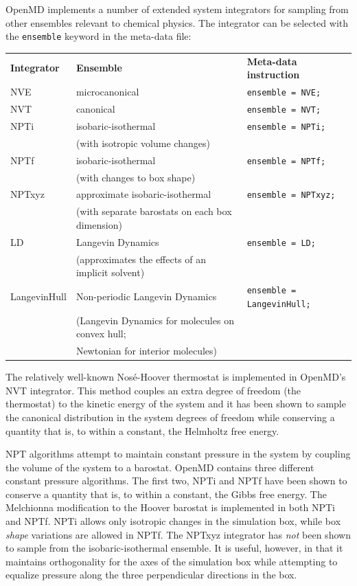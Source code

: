 \documentclass[]{book}
\begin{document}
{\sc OpenMD} implements a number of extended system integrators for
sampling from other ensembles relevant to chemical physics.  The
integrator can be selected with the {\tt ensemble} keyword in the
meta-data file:

\begin{center}
\begin{tabular}{lll}
{\bf Integrator} & {\bf Ensemble} & {\bf Meta-data instruction} \\
NVE & microcanonical & {\tt ensemble = NVE; } \\
NVT & canonical & {\tt ensemble = NVT; } \\
NPTi & isobaric-isothermal & {\tt ensemble = NPTi;} \\
  &  (with isotropic volume changes) & \\
NPTf & isobaric-isothermal & {\tt ensemble = NPTf;} \\
  & (with changes to box shape) & \\
NPTxyz & approximate isobaric-isothermal & {\tt ensemble = NPTxyz;} \\
 &  (with separate barostats on each box dimension) & \\
LD & Langevin Dynamics & {\tt ensemble = LD;} \\
 &  (approximates the effects of an implicit solvent) & \\
 LangevinHull & Non-periodic Langevin Dynamics  & {\tt ensemble = LangevinHull;} \\
 & (Langevin Dynamics for molecules on convex hull;\\
 & Newtonian for interior molecules) & \\
\end{tabular}
\end{center}

The relatively well-known Nos\'e-Hoover thermostat\cite{Hoover85} is
implemented in {\sc OpenMD}'s NVT integrator.  This method couples an
extra degree of freedom (the thermostat) to the kinetic energy of the
system and it has been shown to sample the canonical distribution in
the system degrees of freedom while conserving a quantity that is, to
within a constant, the Helmholtz free energy.\cite{melchionna93}

NPT algorithms attempt to maintain constant pressure in the system by
coupling the volume of the system to a barostat.  {\sc OpenMD} contains
three different constant pressure algorithms.  The first two, NPTi and
NPTf have been shown to conserve a quantity that is, to within a
constant, the Gibbs free energy.\cite{melchionna93} The Melchionna
modification to the Hoover barostat is implemented in both NPTi and
NPTf.  NPTi allows only isotropic changes in the simulation box, while
box {\it shape} variations are allowed in NPTf.  The NPTxyz integrator
has {\it not} been shown to sample from the isobaric-isothermal
ensemble.  It is useful, however, in that it maintains orthogonality
for the axes of the simulation box while attempting to equalize
pressure along the three perpendicular directions in the box.
\end{document}
